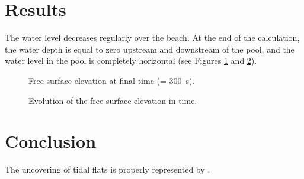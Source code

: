 \section{Results}
The water level decreases regularly over the beach. At the end of the
calculation, the water depth is equal to
zero upstream and downstream of the pool, and the water level in the pool
is completely horizontal (see Figures \ref{fig:vasque:FreeSurfacetf}
and \ref{fig:vasque:FreeSurface}).

\begin{figure}[H]
 \centering
  \caption{Free surface elevation at final time (= 300~s).}\label{fig:vasque:FreeSurfacetf}
\end{figure}

\begin{figure}[H]
 \centering
  \caption{Evolution of the free surface elevation in time.}\label{fig:vasque:FreeSurface}
\end{figure}

\section{Conclusion}
The uncovering of tidal flats is properly represented by .

